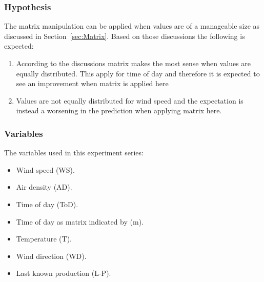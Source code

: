 \subsubsection{Hypothesis} 
The matrix manipulation can be applied when values are of a manageable size as discussed in Section~\ref{sec:Matrix}. Based on those discussions the following is expected: 

\begin{enumerate}
\item According to the discussions matrix makes the most sense when values are equally distributed. This apply for time of day and therefore it is expected to see an improvement when matrix is applied here
\item Values are not equally distributed for wind speed and the expectation is instead a worsening in the prediction when applying matrix here.
\end{enumerate}

\subsubsection{Variables}
The variables used in this experiment series:

\begin{itemize}
\item Wind speed (WS).
\item Air density (AD).
\item Time of day (ToD).
\item Time of day as matrix indicated by (m).
\item Temperature (T).
\item Wind direction (WD).
\item Last known production (L-P).
\end{itemize}


